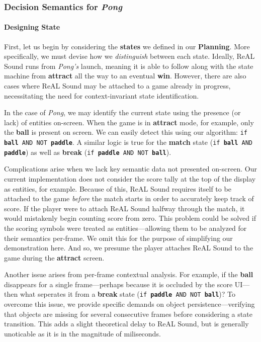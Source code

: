 \documentclass{report}
\newcommand{\rs}{ReAL Sound\xspace}
\newcommand{\plan}{\textbf{Planning}\xspace}
\newcommand{\state}[1]{\textbf{#1}}
\newcommand{\pad}{\textbf{paddle}\xspace}
\newcommand{\ball}{\textbf{ball}\xspace}
\begin{document}
\subsubsection{Decision Semantics for \emph{Pong}}
\paragraph{Designing State}

First, let us begin by considering the \state{states} we defined in our \plan. More specifically, we must devise how we \emph{distinguish} between each state. Ideally, \rs runs from \emph{Pong's} launch, meaning it is able to follow along with the state machine from \state{attract} all the way to an eventual \state{win}. However, there are also cases where \rs may be attached to a game already in progress, necessitating the need for context-invariant state identification.

In the case of \emph{Pong}, we may identify the current state using the presence (or lack) of entities on-screen. When the game is in \state{attract} mode, for example, only the \ball is present on screen. We can easily detect this using our algorithm: \texttt{if \ball AND NOT \pad}. A similar logic is true for the \state{match} state (\texttt{if \ball AND \pad}) as well as \state{break} (\texttt{if \pad AND NOT \ball}). 

Complications arise when we lack key semantic data not presented on-screen. Our current implementation does not consider the score tally at the top of the display as entities, for example. Because of this, \rs requires itself to be attached to the game \emph{before} the match starts in order to accurately keep track of score. If the player were to attach \rs halfway through the match, it would mistakenly begin counting score from zero. This problem could be solved if the scoring symbols were treated as entities---allowing them to be analyzed for their semantics per-frame. We omit this for the purpose of simplifying our demonstration here. And so, we presume the player attaches \rs to the game during the \state{attract} screen. 

Another issue arises from per-frame contextual analysis. For example, if the \ball disappears for a single frame---perhaps because it is occluded by the score UI---then what seperates it from a \state{break} state (\texttt{if \pad AND NOT \ball})? To overcome this issue, we provide specific demands on object persistence---verifying that objects are missing for several consecutive frames before considering a state transition. This adds a slight theoretical delay to \rs, but is generally unoticable as it is in the magnitude of miliseconds.
\end{document}
